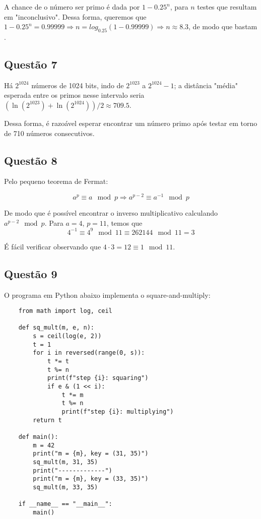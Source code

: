 \documentclass{article}
\begin{document}
A chance de o número ser primo é dada por $1-0.25^{n}$, para $n$ testes que resultam em "inconclusivo". Dessa forma, queremos que $1-0.25^n = 0.99999 \Rightarrow n = log_{0.25}(1-0.99999) \Rightarrow n \approx 8.3$, de modo que bastam .

\subsection*{Questão 7}

Há $2^{1024}$ números de 1024 bits, indo de $2^{1023}$ a $2^{1024} - 1$; a distância "média" esperada entre os primos nesse intervalo seria $\left(\ln(2^{1023}) + \ln(2^{1024})\right)/2 \approx 709.5$.

Dessa forma, é razoável esperar encontrar um número primo após testar em torno de 710 números consecutivos.

\subsection*{Questão 8}

Pelo pequeno teorema de Fermat:

\begin{equation*}
    a^p \equiv a \mod p \Rightarrow a^{p-2} \equiv a^{-1} \mod p
\end{equation*}

De modo que é possível encontrar o inverso multiplicativo calculando $a^{p-2} \mod p$. Para $a = 4$, $p = 11$, temos que
\begin{equation*}
    4^{-1} \equiv 4^9 \mod 11 \equiv 262144 \mod 11 = \boxed{3}
\end{equation*}

É fácil verificar observando que $4 \cdot 3 = 12 \equiv 1 \mod 11$.

\subsection*{Questão 9}

O programa em Python abaixo implementa o square-and-multiply:

\begin{verbatim}
    from math import log, ceil

    def sq_mult(m, e, n):
        s = ceil(log(e, 2))
        t = 1
        for i in reversed(range(0, s)):
            t *= t
            t %= n
            print(f"step {i}: squaring")
            if e & (1 << i):
                t *= m
                t %= n
                print(f"step {i}: multiplying")
        return t
    
    def main():
        m = 42
        print("m = {m}, key = (31, 35)")
        sq_mult(m, 31, 35)
        print("-------------")
        print("m = {m}, key = (33, 35)")
        sq_mult(m, 33, 35)
    
    if __name__ == "__main__":
        main()
     
\end{verbatim}
\end{document}
